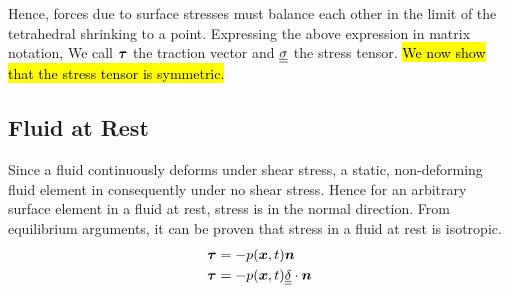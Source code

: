 Hence, forces due to surface stresses must balance each other in the limit of the tetrahedral shrinking to a point. Expressing the above expression in matrix notation,
We call $\boldsymbol{\tau}$ the traction vector and $\underline{\underline{\sigma}}$ the stress tensor.
\hl{We now show that the stress tensor is symmetric.}
\subsection{Fluid at Rest}
Since a fluid continuously deforms under shear stress, a static, non-deforming fluid element in consequently under no shear stress. Hence for an arbitrary surface element in a fluid at rest, stress is in the normal direction. From equilibrium arguments, it can be proven that stress in a fluid at rest is isotropic.
\begin{equation}
\begin{split}
    \boldsymbol{\tau} &= -p(\boldsymbol{x},t)\boldsymbol{n} \\
    \boldsymbol{\tau} &= -p(\boldsymbol{x},t)\underline{\underline{\delta}}\cdot\boldsymbol{n}
\end{split}
\end{equation}
